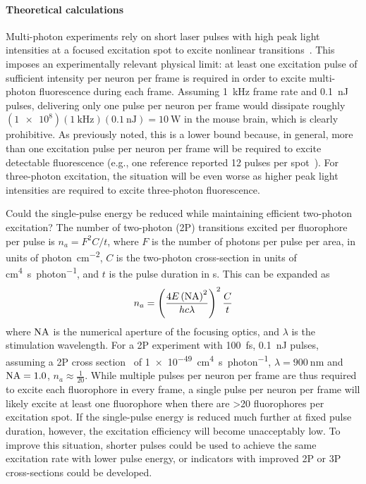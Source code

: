 \paragraph{Theoretical calculations}
Multi-photon experiments rely on short laser pulses with high peak light intensities at a focused excitation spot to excite nonlinear transitions~\cite{kim99}.
This imposes an experimentally relevant physical limit: at least one excitation pulse of sufficient intensity per neuron per frame is required in order to excite multi-photon fluorescence during each frame.
Assuming \SI{1}{\kilo\hertz} frame rate and \SI{0.1}{\nano\joule} pulses, delivering only one pulse per neuron per frame would dissipate roughly $\left(\num{1e8}\right)\left(\SI{1}{\kilo\hertz}\right)\left(\SI{0.1}{\nano\joule}\right)=\SI{10}{\watt}$ in the mouse brain, which is clearly prohibitive.
As previously noted, this is a lower bound because, in general, more than one excitation pulse per neuron per frame will be required to excite detectable fluorescence (e.g., one reference reported 12 pulses per spot~\cite{kim99}).
For three-photon excitation, the situation will be even worse as higher peak light intensities are required to excite three-photon fluorescence.

Could the single-pulse energy be reduced while maintaining efficient two-photon excitation? The number of two-photon (2P) transitions excited per fluorophore per pulse is $n_a = F^2 C / t$, where $F$ is the number of photons per pulse per area, in units of \si{photon\per\centi\meter\squared}, $C$ is the two-photon cross-section in units of \si{\centi\meter\tothe{4}\second\per photon}, and $t$ is the pulse duration in \si{\second}.
This can be expanded as
\[n_a = \left(\frac{4E\left(\text{NA}\right)^2}{h c \lambda}\right)^2 \frac{C}{t}\]
where $\text{NA}$ is the numerical aperture of the focusing optics, and $\lambda$ is the stimulation wavelength.
For a 2P experiment with \SI{100}{\femto\second}, \SI{0.1}{\nano\joule} pulses, assuming a 2P cross section~\cite{masters06} of \SI{1e-49}{\centi\meter\tothe{4}\second\per photon}, $\lambda=\SI{900}{\nano\meter}$ and $\text{NA}=1.0$, $n_a \approx \frac{1}{20}$.
While multiple pulses per neuron per frame are thus required to excite each fluorophore in every frame, a single pulse per neuron per frame will likely excite at least one fluorophore when there are \num{>20} fluorophores per excitation spot.
If the single-pulse energy is reduced much further at fixed pulse duration, however, the excitation efficiency will become unacceptably low.
To improve this situation, shorter pulses could be used to achieve the same excitation rate with lower pulse energy, or indicators with improved 2P or 3P cross-sections could be developed.

